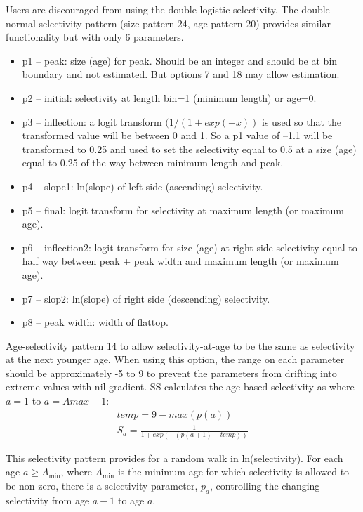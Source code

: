 Users are discouraged from using the double logistic selectivity. The double normal selectivity pattern (size pattern 24, age pattern 20) provides similar functionality but with only 6 parameters.
	\begin{itemize}
		\item  p1 – peak: size (age) for peak. Should be an integer and should be at bin boundary and not estimated.  But options 7 and 18 may allow estimation.
		\item p2 – initial: selectivity at length bin=1 (minimum length) or age=0.
		\item p3 – inflection: a logit transform $(1/(1+exp(-x))$ is used so that the transformed value will be between 0 and 1.  So a p1 value of –1.1 will be transformed to 0.25 and used to set the selectivity equal to 0.5 at a size (age) equal to 0.25 of the way between minimum length and peak. 
		\item p4 – slope1: ln(slope) of left side (ascending) selectivity.
		\item p5 – final: logit transform for selectivity at maximum length (or maximum age).
		\item p6 – inflection2:  logit transform for size (age) at right side selectivity equal to half way between peak + peak width and maximum length (or maximum age).
		\item p7 – slop2: ln(slope) of right side (descending) selectivity.
		\item p8 – peak width: width of flattop.
	\end{itemize}


Age-selectivity pattern 14 to allow selectivity-at-age to be the same as selectivity at the next younger age.  When using this option, the range on each parameter should be approximately -5 to 9 to prevent the parameters from drifting into extreme values with nil gradient. SS calculates the age-based selectivity as where $a = 1$ to $a = Amax + 1$:
	\begin{equation}
		 \begin{split}
		 temp = 9 - max(p(a))\\
		S_a = \frac{1}{1+exp(-(p(a+1) + temp))}
		\end{split}
	\end{equation}	

This selectivity pattern provides for a random walk in ln(selectivity).  For each age $a \geq A_{\text{min}}$, where $A_{\text{min}}$ is the minimum age for which selectivity is allowed to be non-zero, there is a selectivity parameter, $p_a$, controlling the changing selectivity from age $a-1$ to age $a$.
	
